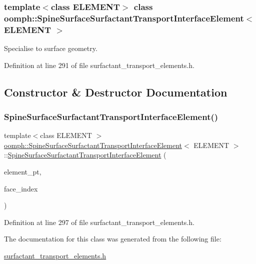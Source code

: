 \subsubsection*{template$<$class E\+L\+E\+M\+E\+NT$>$\newline
class oomph\+::\+Spine\+Surface\+Surfactant\+Transport\+Interface\+Element$<$ E\+L\+E\+M\+E\+N\+T $>$}

Specialise to surface geometry. 

Definition at line 291 of file surfactant\+\_\+transport\+\_\+elements.\+h.



\subsection{Constructor \& Destructor Documentation}
\mbox{\label{classoomph_1_1SpineSurfaceSurfactantTransportInterfaceElement_aa3014e796ec7e0bfa26824fc42184d06}} 
\subsubsection{\texorpdfstring{Spine\+Surface\+Surfactant\+Transport\+Interface\+Element()}{SpineSurfaceSurfactantTransportInterfaceElement()}}
{\footnotesize\ttfamily template$<$class E\+L\+E\+M\+E\+NT $>$ \\
\hyperlink{classoomph_1_1SpineSurfaceSurfactantTransportInterfaceElement}{oomph\+::\+Spine\+Surface\+Surfactant\+Transport\+Interface\+Element}$<$ E\+L\+E\+M\+E\+NT $>$\+::\hyperlink{classoomph_1_1SpineSurfaceSurfactantTransportInterfaceElement}{Spine\+Surface\+Surfactant\+Transport\+Interface\+Element} (\begin{DoxyParamCaption}\item[{\hyperlink{classoomph_1_1FiniteElement}{Finite\+Element} $\ast$const \&}]{element\+\_\+pt,  }\item[{const int \&}]{face\+\_\+index }\end{DoxyParamCaption})\hspace{0.3cm}{\ttfamily [inline]}}



Definition at line 297 of file surfactant\+\_\+transport\+\_\+elements.\+h.



The documentation for this class was generated from the following file\+:\begin{DoxyCompactItemize}
\item 
\hyperlink{surfactant__transport__elements_8h}{surfactant\+\_\+transport\+\_\+elements.\+h}\end{DoxyCompactItemize}
